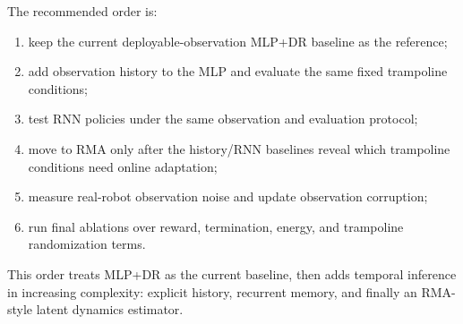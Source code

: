 \documentclass[11pt, a4paper]{article}
\begin{document}
The recommended order is:
\begin{enumerate}
    \item keep the current deployable-observation MLP+DR baseline as the
    reference;
    \item add observation history to the MLP and evaluate the same fixed
    trampoline conditions;
    \item test RNN policies under the same observation and evaluation protocol;
    \item move to RMA only after the history/RNN baselines reveal which
    trampoline conditions need online adaptation;
    \item measure real-robot observation noise and update observation
    corruption;
    \item run final ablations over reward, termination, energy, and trampoline
    randomization terms.
\end{enumerate}

This order treats MLP+DR as the current baseline, then adds temporal inference
in increasing complexity: explicit history, recurrent memory, and finally an
RMA-style latent dynamics estimator.
\end{document}
